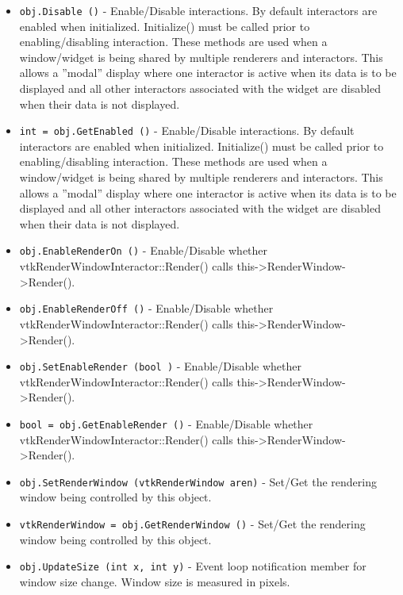 \begin{itemize}
\item  \verb|obj.Disable ()| -  Enable/Disable interactions.  By default interactors are enabled when
 initialized.  Initialize() must be called prior to enabling/disabling
 interaction. These methods are used when a window/widget is being
 shared by multiple renderers and interactors.  This allows a ''modal''
 display where one interactor is active when its data is to be displayed
 and all other interactors associated with the widget are disabled
 when their data is not displayed.

\item  \verb|int = obj.GetEnabled ()| -  Enable/Disable interactions.  By default interactors are enabled when
 initialized.  Initialize() must be called prior to enabling/disabling
 interaction. These methods are used when a window/widget is being
 shared by multiple renderers and interactors.  This allows a ''modal''
 display where one interactor is active when its data is to be displayed
 and all other interactors associated with the widget are disabled
 when their data is not displayed.

\item  \verb|obj.EnableRenderOn ()| -  Enable/Disable whether vtkRenderWindowInteractor::Render() calls
 this->RenderWindow->Render().

\item  \verb|obj.EnableRenderOff ()| -  Enable/Disable whether vtkRenderWindowInteractor::Render() calls
 this->RenderWindow->Render().

\item  \verb|obj.SetEnableRender (bool )| -  Enable/Disable whether vtkRenderWindowInteractor::Render() calls
 this->RenderWindow->Render().

\item  \verb|bool = obj.GetEnableRender ()| -  Enable/Disable whether vtkRenderWindowInteractor::Render() calls
 this->RenderWindow->Render().

\item  \verb|obj.SetRenderWindow (vtkRenderWindow aren)| -  Set/Get the rendering window being controlled by this object.

\item  \verb|vtkRenderWindow = obj.GetRenderWindow ()| -  Set/Get the rendering window being controlled by this object.

\item  \verb|obj.UpdateSize (int x, int y)| -  Event loop notification member for window size change.
 Window size is measured in pixels.


\end{itemize}
